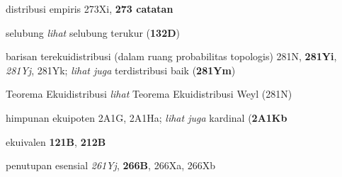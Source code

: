 distribusi empiris 273Xi, {\bf 273 catatan}





















selubung {\it lihat}
selubung terukur ({\bf 132D})


















barisan terekuidistribusi (dalam ruang probabilitas topologis) 281N,
{\bf 281Yi}, {\it 281Yj}, 281Yk; 
  {\it lihat juga}
  terdistribusi baik ({\bf 281Ym})

  

Teorema Ekuidistribusi {\it lihat} Teorema Ekuidistribusi Weyl (281N)







himpunan ekuipoten 2A1G, 2A1Ha; 
  {\it lihat juga} kardinal ({\bf 2A1Kb}










ekuivalen {\bf 121B}, {\bf 212B}


























penutupan esensial {\it 261Yj}, {\bf 266B}, 266Xa, 266Xb




